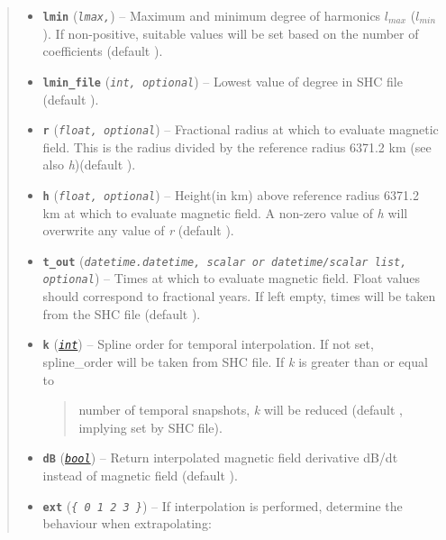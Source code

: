 \documentclass[letterpaper,10pt,english]{sphinxhowto}
\begin{document}
\begin{fulllineitems}
\begin{quote}
\begin{description}
\begin{itemize}
\item {} 
\textbf{\texttt{lmin}} (\emph{\texttt{lmax,}}) -- Maximum and minimum  degree of harmonics \(l_{max}\)
(\(l_{min}\)). If non-positive, suitable values will be set
based on the number of coefficients (default ).

\item {} 
\textbf{\texttt{lmin\_file}} (\emph{\texttt{int, optional}}) -- Lowest value of degree in SHC file (default ).

\item {} 
\textbf{\texttt{r}} (\emph{\texttt{float, optional}}) -- Fractional radius at which to evaluate magnetic field. This is the
radius divided by the reference radius 6371.2 km
(see also \emph{h})(default ).

\item {} 
\textbf{\texttt{h}} (\emph{\texttt{float, optional}}) -- Height(in km) above reference radius 6371.2 km at which to evaluate
magnetic field. A non-zero value of \emph{h} will overwrite any
value of \emph{r} (default ).

\item {} 
\textbf{\texttt{t\_out}} (\emph{\texttt{datetime.datetime, scalar or datetime/scalar list, optional}}) -- Times at which to evaluate magnetic field. Float values should
correspond to fractional years. If left empty, times will be taken
from the SHC file (default \code{{[}{]}}).

\item {} 
\textbf{\texttt{k}} (\href{https://docs.python.org/library/functions.html\#int}{\emph{\texttt{int}}}) -- 
Spline order for temporal interpolation. If not set, spline\_order
will be taken from SHC file. If \emph{k} is greater than or equal to
\begin{quote}

number of temporal snapshots, \emph{k} will be reduced (default ,
implying set by SHC file).
\end{quote}


\item {} 
\textbf{\texttt{dB}} (\href{https://docs.python.org/library/functions.html\#bool}{\emph{\texttt{bool}}}) -- Return interpolated magnetic field derivative dB/dt instead of
magnetic field (default ).

\item {} 
\textbf{\texttt{ext}} (\emph{\texttt{\{ 0 \textbar{} 1 \textbar{} 2 \textbar{} 3 \}}}) -- 
If interpolation is performed, determine the behaviour when
extrapolating:
\begin{quote}


\end{quote}
\end{itemize}
\end{description}
\end{quote}
\end{fulllineitems}
\end{document}
